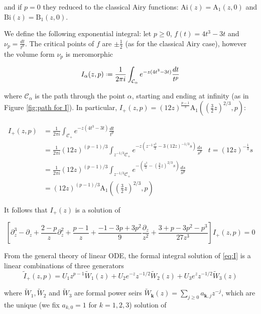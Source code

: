 \documentclass{article}
\theoremstyle{definition}
\newcommand*{\defeq}{\mathrel{\vcenter{\baselineskip0.5ex \lineskiplimit0pt
                     \hbox{\scriptsize.}\hbox{\scriptsize.}}}%
                     =}
\begin{document}
and if $p=0$ they reduced to the classical Airy functions: $\mathrm{Ai}(z)=\mathrm{A}_1(z,0)$ and $\mathrm{Bi}(z)=\mathrm{B}_1(z,0)$.

We define the following exponential integral: let $p\geq 0$, $f(t)=4t^3-3t$ and $\nu_p=\tfrac{dt}{t^p}$. The critical points of $f$ are $\pm\tfrac{1}{2}$ (as for the classical Airy case), however the volume form $\nu_p$ is meromorphic    

\begin{equation}
I_\alpha(z,p)\defeq\frac{1}{2\pi i}\int_{\mathcal{C}_{\alpha}}e^{-z(4t^3-3t)}\frac{dt}{t^p}
\end{equation}

where $\mathcal{C}_\alpha$ is the path through the point $\alpha$, starting and ending at infinity (as in Figure \ref{fig:path for I}). In particular, $I_{+}(z,p)=(12 z)^{\tfrac{p-1}{3}}\mathrm{A}_1((\tfrac{3}{2}z)^{2/3},p)$: 

\begin{align*}
I_{+}(z,p)&=\frac{1}{2\pi i}\int_{\mathcal{C}_{+}}e^{-z(4t^3-3t)}\frac{dt}{t^p} &\\
&=\frac{1}{2\pi i}(12 z)^{(p-1)/3}\int_{z^{-1/3}\mathcal{C}_{+}}e^{-z(z^{-1}\frac{s^3}{3}-3 (12 z)^{-1/3}s)}\frac{ds}{s^p} & t=(12 z)^{-\tfrac{1}{3}}s\\
&=\frac{1}{2\pi i}(12 z)^{(p-1)/3}\int_{z^{-1/3}\mathcal{C}_{+}}e^{-\left(\frac{s^3}{3}-(\tfrac{3}{2} z)^{2/3}s\right)}\frac{ds}{s^p} & \\
&=(12 z)^{(p-1)/3}\mathrm{A}_1((\tfrac{3}{2}z)^{2/3},p)
\end{align*}

It follows that $I_+(z)$ is a solution of


\begin{equation}\label{eq:I}
\left[\partial_z^3-\partial_z+\frac{2-p}{z}\partial_z^2+\frac{p-1}{z}+\frac{-1-3p+3p^2}{9}\frac{\partial_z}{z^2}+\frac{3+p-3p^2-p^3}{27z^3}\right]I_+(z,p)=0
\end{equation}

From the general theory of linear ODE, the formal integral solution of \eqref{eq:I} is a linear combinations of three generators 
\begin{equation}
\tilde{I}_+(z,p)=U_1z^{p-1}\tilde{W}_1(z)+U_2e^{-z}z^{-1/2}\tilde{W}_2(z)+U_3e^{z}z^{-1/2}\tilde{W}_3(z)
\end{equation}
 
where $\tilde{W}_1, \tilde{W}_2$ and $\tilde{W}_3$ are formal power seirs $\tilde{W}_{\mathbf{k}}(z)=\sum_{j\geq 0}a_{\mathbf{k},j}z^{-j}$, which are the unique (we fix $a_{k,0}=1$ for $k=1,2,3$) solution of 
\end{document}
